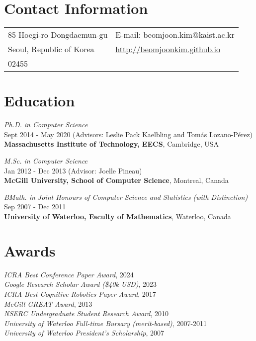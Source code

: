 \documentclass[line,margin,letterpaper]{res}
\begin{document}
\newcommand{\sth}[0]{$^{\textrm{th}}$ }



\begin{resume}
\section{Contact Information}
\hspace{-10px}
\begin{tabular}{ll}
85 Hoegi-ro Dongdaemun-gu & E-mail: beomjoon.kim@kaist.ac.kr\\
Seoul, Republic of Korea& \small{\url{http://beomjoonkim.github.io}}\\
02455 & \\
\end{tabular}


\section{Education}
{\sl Ph.D. in Computer Science} \\Sept 2014 - May 2020 (Advisors: Leslie Pack Kaelbling
and Tom\'as Lozano-P\'erez)\\
\textbf{Massachusetts Institute of Technology, EECS}, Cambridge, USA


{\sl M.Sc. in Computer Science} \\Jan 2012 - Dec 2013 (Advisor: Joelle Pineau)\\
\textbf{McGill University, School of Computer Science}, Montreal, Canada

{\sl BMath. in Joint Honours of Computer Science and Statistics (with Distinction)} \\Sep 2007 - Dec 2011\\
\textbf{University of Waterloo, Faculty of Mathematics}, Waterloo, Canada



\section{Awards}
{\sl ICRA Best Conference Paper Award}, 2024
\\
{\sl Google Research Scholar Award (\$40k USD)}, 2023
\\
{\sl ICRA Best Cognitive Robotics Paper Award}, 2017
\\
{\sl McGill GREAT Award}, 2013
\\
{\sl NSERC Undergraduate Student Research Award}, 2010
\\
{\sl University of Waterloo Full-time Bursary (merit-based)}, 2007-2011
\\
{\sl University of Waterloo President's Scholarship}, 2007



\end{resume}
\end{document}
